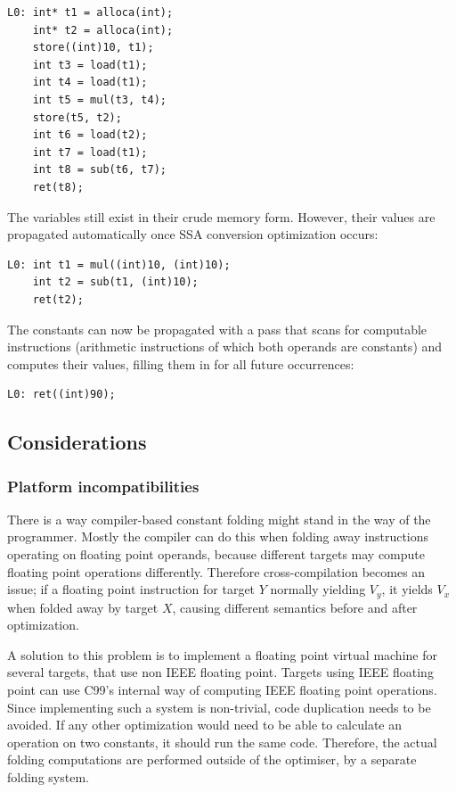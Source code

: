 \documentclass[12pt, a4paper]{article}
\begin{document}
\begin{lstlisting}
L0:	int* t1 = alloca(int);
	int* t2 = alloca(int);
	store((int)10, t1);
	int t3 = load(t1);
	int t4 = load(t1);
	int t5 = mul(t3, t4);
	store(t5, t2);
	int t6 = load(t2);
	int t7 = load(t1);
	int t8 = sub(t6, t7);
	ret(t8);
\end{lstlisting}

The variables still exist in their crude memory form. However, their values are 
propagated automatically once SSA conversion optimization occurs:

\begin{lstlisting}
L0:	int t1 = mul((int)10, (int)10);
	int t2 = sub(t1, (int)10);
	ret(t2);
\end{lstlisting}

The constants can now be propagated with a pass that scans for computable 
instructions (arithmetic instructions of which both operands are constants) and 
computes their values, filling them in for all future occurrences:

\begin{lstlisting}
L0:	ret((int)90);
\end{lstlisting}

\subsection{Considerations}
\subsubsection{Platform incompatibilities}
There is a way compiler-based constant folding might stand in the way of the 
programmer. Mostly the compiler can do this when folding
away instructions  operating on floating point operands, because different targets may compute 
floating point operations differently. Therefore cross-compilation becomes an 
issue; if a floating point instruction for target $Y$ normally yielding $V_y$, it 
yields $V_x$ when folded away by target $X$, causing different semantics before and 
after optimization.\cite{cfld_cross}

A solution to this problem is to implement a floating point virtual machine for 
several targets, that use non IEEE floating point. Targets using IEEE floating 
point can use C99's internal way of computing IEEE floating point operations.
Since implementing such a system is non-trivial, code duplication needs to be 
avoided. If any other optimization would need to be able to calculate an 
operation on two constants, it should run the same code. Therefore, the actual 
folding computations are performed outside of the optimiser, by a separate 
folding system.
\end{document}
